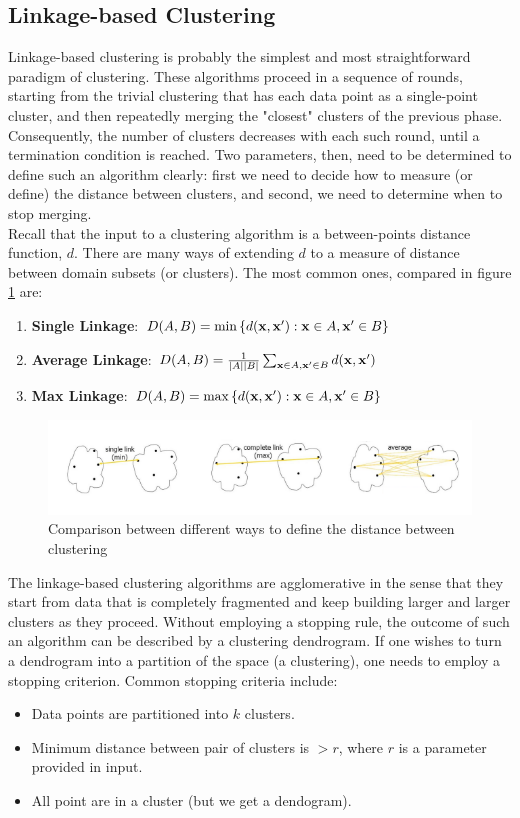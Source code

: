 \documentclass[12pt]{report}
\theoremstyle{plain}
\begin{document}
\begin{flushleft}
\section{Linkage-based Clustering}
Linkage-based clustering is probably the simplest and most straightforward paradigm of clustering. These algorithms proceed in a sequence of rounds, starting from the trivial clustering that has each data point as a single-point cluster, and then repeatedly merging the "closest" clusters of the previous phase. Consequently, the number of clusters decreases with each such round, until a termination condition is reached. Two parameters, then, need to be determined to define such an algorithm clearly: first we need to decide how to measure (or define) the distance between clusters, and second, we need to determine when to stop merging.\\
Recall that the input to a clustering algorithm is a between-points distance function, $d$. There are many ways of extending $d$ to a measure of distance between domain subsets (or clusters). The most common ones, compared in figure \ref{fig:clus_lbc_d} are:
\begin{enumerate}
	\item \textbf{Single Linkage}: $D(A,B)=\min\left\{d(\vb{x},\vb{x'}):\vb{x}\in A,\vb{x'}\in B \right\}$
	\item \textbf{Average Linkage}: $D(A,B)=\frac{1}{\abs{A}\abs{B}}\sum_{\vb{x}\in A,\vb{x'}\in B} d(\vb{x},\vb{x'})$
		\item \textbf{Max Linkage}: $D(A,B)=\max\left\{d(\vb{x},\vb{x'}):\vb{x}\in A,\vb{x'}\in B \right\}$
\end{enumerate}
\begin{figure}[!h]
	\centering
	\includegraphics[scale=1.3]{images/clus_lbc_distance.pdf}
	\caption{Comparison between different ways to define the distance between clustering}
	\label{fig:clus_lbc_d}
\end{figure}
The linkage-based clustering algorithms are agglomerative in the sense that they start from data that is completely fragmented and keep building larger and larger clusters as they proceed. Without employing a stopping rule, the outcome of such an algorithm can be described by a clustering dendrogram. If one wishes to turn a dendrogram into a partition of the space (a clustering), one needs to employ a stopping criterion. Common stopping criteria include:
\begin{itemize}
	\item Data points are partitioned into $k$ clusters.
	\item Minimum distance between pair of clusters is $>r$, where $r$ is a parameter provided in input.
	\item All point are in a cluster (but we get a dendogram).
\end{itemize}


\end{flushleft}
\end{document}
